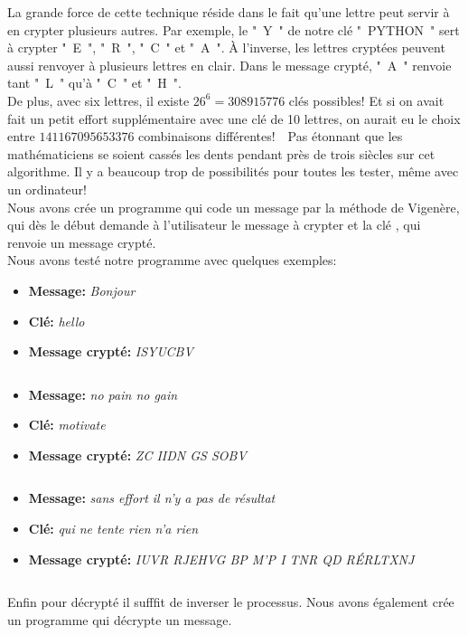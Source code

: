 \documentclass{article}
\begin{document}
La grande force de cette technique réside dans le fait qu’une lettre peut servir à en crypter plusieurs autres. Par exemple, le " Y " de notre clé " PYTHON " sert à crypter " E ", " R ", " C " et " A ". À l’inverse, les lettres cryptées peuvent aussi renvoyer à plusieurs lettres en clair. Dans le message crypté, " A " renvoie tant " L " qu’à " C " et " H ".\\

De plus, avec six lettres, il existe $26^6 = 308 915 776$ clés possibles! Et si on avait fait un petit effort supplémentaire avec une clé de 10 lettres, on aurait eu le choix entre $141 167 095 653 376$ combinaisons différentes!  Pas étonnant que les mathématiciens se soient cassés les dents pendant près de trois siècles sur cet algorithme. Il y a beaucoup trop de possibilités pour toutes les tester, même avec un ordinateur!\\

Nous avons crée un programme qui code un message par la méthode de Vigenère, qui dès le début demande à l'utilisateur le message à crypter et la clé , qui renvoie un message crypté. 
\\

Nous avons testé notre programme avec quelques exemples:
\begin{itemize}[label=\textbullet, font=\LARGE \color{black}]
\item \textbf{Message:} \textit{Bonjour}
\item \textbf{Clé:} \textit{hello}
\item \textbf{Message crypté:}  \textit{ISYUCBV}
\end{itemize}
$$ $$

\begin{itemize}[label=\textbullet, font=\LARGE \color{black}]
\item \textbf{Message:} \textit{no pain no gain}
\item \textbf{Clé:} \textit{motivate}
\item \textbf{Message crypté:}  \textit{ZC IIDN GS SOBV}
\end{itemize}
$$ $$ 

\begin{itemize}[label=\textbullet, font=\LARGE \color{black}]
\item \textbf{Message:} \textit{sans effort il n'y a pas de résultat}
\item \textbf{Clé:} \textit{qui ne tente rien n'a rien}
\item \textbf{Message crypté:}  \textit{IUVR RJEHVG BP M'P I TNR QD RÉRLTXNJ}
\end{itemize}
$$ $$

Enfin pour décrypté il sufffit de inverser le processus. Nous avons également crée un programme qui décrypte un message. 
\end{document}
